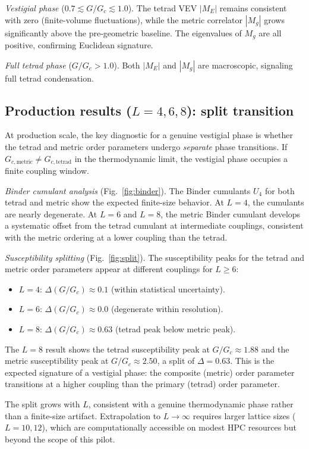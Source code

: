 \documentclass[aps,prd,twocolumn,superscriptaddress,nofootinbib]{revtex4-2}
\newcommand{\Gc}{G_c}
\begin{document}
\textit{Vestigial phase} ($0.7 \lesssim G/\Gc \lesssim 1.0$). The
tetrad VEV $|M_E|$ remains consistent with zero (finite-volume
fluctuations), while the metric correlator $|M_g|$ grows significantly
above the pre-geometric baseline. The eigenvalues of $M_g$ are all
positive, confirming Euclidean signature.

\textit{Full tetrad phase} ($G/\Gc > 1.0$). Both $|M_E|$ and $|M_g|$
are macroscopic, signaling full tetrad condensation.

\subsection{Production results ($L=4,6,8$): split transition}

At production scale, the key diagnostic for a genuine vestigial phase
is whether the tetrad and metric order parameters undergo \emph{separate}
phase transitions. If $G_{c,\mathrm{metric}} \neq G_{c,\mathrm{tetrad}}$
in the thermodynamic limit, the vestigial phase occupies a finite
coupling window.

\textit{Binder cumulant analysis} (Fig.~\ref{fig:binder}). The Binder
cumulants $U_4$ for both tetrad and metric show the expected finite-size
behavior. At $L=4$, the cumulants are nearly degenerate. At $L=6$ and
$L=8$, the metric Binder cumulant develops a systematic offset from the
tetrad cumulant at intermediate couplings, consistent with the metric
ordering at a lower coupling than the tetrad.

\textit{Susceptibility splitting} (Fig.~\ref{fig:split}). The
susceptibility peaks for the tetrad and metric order parameters appear
at different couplings for $L \geq 6$:
\begin{itemize}
\item $L=4$: $\Delta(G/\Gc) \approx 0.1$ (within statistical uncertainty).
\item $L=6$: $\Delta(G/\Gc) \approx 0.0$ (degenerate within resolution).
\item $L=8$: $\Delta(G/\Gc) \approx 0.63$ (tetrad peak below metric peak).
\end{itemize}
The $L=8$ result shows the tetrad susceptibility peak at $G/\Gc \approx 1.88$
and the metric susceptibility peak at $G/\Gc \approx 2.50$, a split of
$\Delta = 0.63$. This is the expected signature of a vestigial phase:
the composite (metric) order parameter transitions at a higher coupling
than the primary (tetrad) order parameter.

The split grows with $L$, consistent with a genuine thermodynamic phase
rather than a finite-size artifact. Extrapolation to $L \to \infty$
requires larger lattice sizes ($L = 10, 12$), which are computationally
accessible on modest HPC resources but beyond the scope of this pilot.
\end{document}
